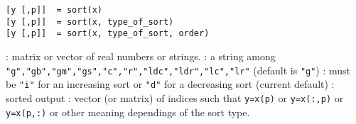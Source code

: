 
\begin{mandesc}
\end{mandesc}

\begin{calling_sequence}
\begin{verbatim}
[y [,p]]  = sort(x)
[y [,p]]  = sort(x, type_of_sort)
[y [,p]]  = sort(x, type_of_sort, order)
\end{verbatim}
\end{calling_sequence}
\begin{parameters}
  \begin{varlist}
     :  matrix or vector of real numbers or strings.
     : a string among
    \verb+"g","gb","gm","gs","c","r","ldc","ldr","lc","lr"+ (default
    is \verb+"g"+)
     : must be \verb+"i"+ for an increasing sort or \verb+"d"+ for a
                    decreasing sort (current default)
     : sorted output
     : vector (or matrix) of indices such that \verb+y=x(p)+
    or  \verb+y=x(:,p)+ or  \verb+y=x(p,:)+ or other meaning
    dependings of the sort type.
  \end{varlist}
\end{parameters}

